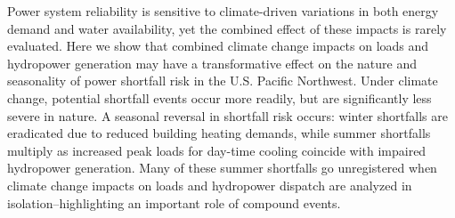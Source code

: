 Power system reliability is sensitive to climate-driven variations in both energy demand and water availability, yet the combined effect of these impacts is rarely evaluated. Here we show that combined climate change impacts on loads and hydropower generation may have a transformative effect on the nature and seasonality of power shortfall risk in the U.S. Pacific Northwest. Under climate change, potential shortfall events occur more readily, but are significantly less severe in nature. A seasonal reversal in shortfall risk occurs: winter shortfalls are eradicated due to reduced building heating demands, while summer shortfalls multiply as increased peak loads for day-time cooling coincide with impaired hydropower generation. Many of these summer shortfalls go unregistered when climate change impacts on loads and hydropower dispatch are analyzed in isolation--highlighting an important role of compound events.